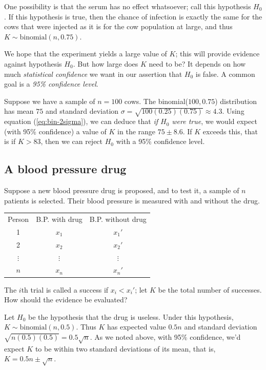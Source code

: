 One possibility is that the serum has no effect whatsoever; call this hypothesis 
$H_0$. If this hypothesis is true, then the chance of infection is exactly the 
same for the cows that were injected as it is for the cow population at large, 
and thus $K \sim \mbox{binomial}(n,0.75)$.

We hope that the experiment yields a large value of $K$; this will provide evidence
against hypothesis $H_0$. But how large does $K$ need to be? It depends on how much
{\it statistical confidence} we want in our assertion that $H_0$ is false. A common
goal is a {\it 95\% confidence level}.

Suppose we have a sample of $n=100$ cows. The binomial($100,0.75$) distribution has 
mean $75$ and standard deviation $\sigma = \sqrt{100(0.25)(0.75)} \approx 4.3$. 
Using equation (\ref{eq:bin-2sigma}), we can deduce that {\it if $H_0$ were true}, 
we would expect (with 95\% confidence) a value of $K$ in the range $75 \pm 8.6$. 
If $K$ exceeds this, that is if $K > 83$, then we can reject $H_0$ with a 95\% 
confidence level.

\subsection{A blood pressure drug}

Suppose a new blood pressure drug is proposed, and to test it, a sample of
$n$ patients is selected. Their blood pressure is measured with and without
the drug.

\begin{tabular}{ccc}
Person   & B.P. with drug & B.P. without drug \\
1        & $x_1$          & $x_1'$ \\
2        & $x_2$          & $x_2'$ \\
$\vdots$ & $\vdots$       & $\vdots$ \\
$n$      & $x_n$          & $x_n'$
\end{tabular}

\noindent
The $i$th trial is called a success if $x_i < x_i'$; let $K$ be the total number
of successes. How should the evidence be evaluated?

Let $H_0$ be the hypothesis that the drug is useless. Under this hypothesis,
$K \sim \mbox{binomial}(n,0.5)$. Thus $K$ has expected value $0.5 n$ and 
standard deviation $\sqrt{n (0.5) (0.5)} = 0.5 \sqrt{n}$. As we
noted above, with 95\% confidence, we'd expect $K$ to be within two standard
deviations of its mean, that is, $K = 0.5 n \pm \sqrt{n}$.

